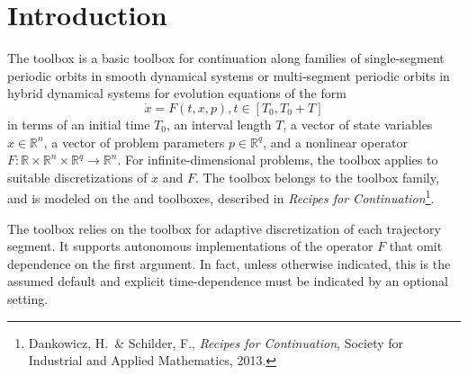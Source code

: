  

\section{Introduction}
\label{chap: po}

The  toolbox is a basic toolbox for continuation along families of single-segment periodic orbits in smooth dynamical systems or multi-segment periodic orbits in hybrid dynamical systems for evolution equations of the form
\begin{equation}
\dot{x}=F(t,x,p), t\in[T_0,T_0+T]
\end{equation}
in terms of an initial time $T_0$, an interval length $T$, a vector of state variables $x\in\mathbb{R}^n$, a vector of problem parameters $p\in\mathbb{R}^q$, and a nonlinear operator $F:\mathbb{R}\times\mathbb{R}^n\times\mathbb{R}^q\rightarrow\mathbb{R}^n$. For infinite-dimensional problems, the toolbox applies to suitable discretizations of $x$ and $F$. The  toolbox belongs to the  toolbox family, and is modeled on the  and  toolboxes, described in \emph{Recipes for Continuation}\footnote{Dankowicz, H.~\& Schilder, F., \emph{Recipes for Continuation}, Society for Industrial and Applied Mathematics, 2013.}.

The  toolbox relies on the  toolbox for adaptive discretization of each trajectory segment. It supports autonomous implementations of the operator $F$ that omit dependence on the first argument. In fact, unless otherwise indicated, this is the assumed default and explicit time-dependence must be indicated by an optional setting.

